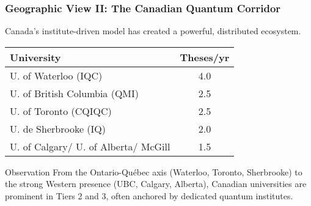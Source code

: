 \documentclass[aspectratio=169]{beamer}
\newcommand{\tabletext}{\small}
\begin{document}
\begin{frame}
    \frametitle{Geographic View II: The Canadian Quantum Corridor}
    Canada's institute-driven model has created a powerful, distributed ecosystem.

    \begin{table}
        \centering
        \tabletext
        \begin{tabularx}{\textwidth}{
            l
            S[table-format=1.1]
        }
            \toprule
            \textbf{University} & {\textbf{Theses/yr}} \\
            \midrule
            U. of Waterloo (IQC) & 4.0 \\
            U. of British Columbia (QMI) & 2.5 \\
            U. of Toronto (CQIQC) & 2.5 \\
            U. de Sherbrooke (IQ) & 2.0 \\
            U. of Calgary/ U. of Alberta/ McGill & 1.5 \\
            \bottomrule
        \end{tabularx}
    \end{table}
    \begin{block}{Observation}
    From the Ontario-Québec axis (Waterloo, Toronto, Sherbrooke) to the strong Western presence (UBC, Calgary, Alberta), Canadian universities are prominent in Tiers 2 and 3, often anchored by dedicated quantum institutes.
    \end{block}
\end{frame}
\end{document}
